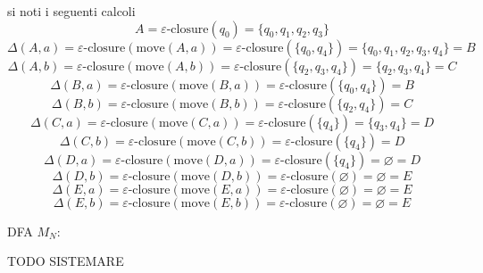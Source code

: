 {        si noti i seguenti calcoli
        \[
        A = \varepsilon\text{-closure}(q_0) = \{q_0, q_1, q_2, q_3\}
        \]
        \[
        \Delta(A, a) = \varepsilon\text{-closure}(\text{move}(A, a)) = \varepsilon\text{-closure}(\{q_0, q_4\}) = \{q_0, q_1, q_2, q_3, q_4\} = B
        \]
        \[
        \Delta(A, b) = \varepsilon\text{-closure}(\text{move}(A, b)) = \varepsilon\text{-closure}(\{q_2, q_3, q_4\}) = \{q_2, q_3, q_4\} = C
        \]
        \[
        \Delta(B, a) = \varepsilon\text{-closure}(\text{move}(B, a)) = \varepsilon\text{-closure}(\{q_0, q_4\}) = B
        \]
        \[
        \Delta(B, b) = \varepsilon\text{-closure}(\text{move}(B, b)) = \varepsilon\text{-closure}(\{q_2, q_4\}) = C
        \]
        \[
        \Delta(C, a) = \varepsilon\text{-closure}(\text{move}(C, a)) = \varepsilon\text{-closure}(\{ q_4\})=\{q_3, q_4\} = D
        \]
        \[
        \Delta(C, b) = \varepsilon\text{-closure}(\text{move}(C, b)) = \varepsilon\text{-closure}(\{q_4\}) = D
        \]
        \[
        \Delta(D, a) = \varepsilon\text{-closure}(\text{move}(D, a)) = \varepsilon\text{-closure}(\{q_4\}) = \varnothing = D
        \]
        \[
        \Delta(D, b) = \varepsilon\text{-closure}(\text{move}(D, b)) = \varepsilon\text{-closure}(\varnothing) = \varnothing = E
        \]
        \[
        \Delta(E, a) = \varepsilon\text{-closure}(\text{move}(E, a)) = \varepsilon\text{-closure}(\varnothing) = \varnothing = E
        \]
        \[
        \Delta(E, b) = \varepsilon\text{-closure}(\text{move}(E, b)) = \varepsilon\text{-closure}(\varnothing) = \varnothing = E
        \]
        
        DFA $M_N$:
        
        TODO SISTEMARE
        \begin{center}
        \end{center}
}



